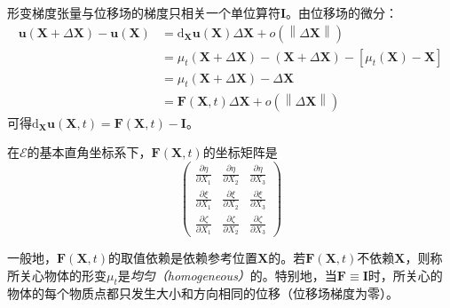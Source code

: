 \documentclass[main.tex]{subfiles}
\begin{document}
形变梯度张量与位移场的梯度只相关一个单位算符$\mathbf{I}$。由位移场的微分：
\begin{align*}
    \mathbf{u}\left(\mathbf{X}+\Delta\mathbf{X}\right)-\mathbf{u}\left(\mathbf{X}\right) & =\mathrm{d}_{\mathbf{X}}\mathbf{u}\left(\mathbf{X}\right)\Delta\mathbf{X}+o\left(\left\|\Delta\mathbf{X}\right\|\right)                      \\
                                                                                         & =\mu_t\left(\mathbf{X}+\Delta\mathbf{X}\right)-\left(\mathbf{X}+\Delta\mathbf{X}\right)-\left[\mu_t\left(\mathbf{X}\right)-\mathbf{X}\right] \\
                                                                                         & =\mu_t\left(\mathbf{X}+\Delta\mathbf{X}\right)-\Delta\mathbf{X}                                                                              \\
                                                                                         & =\mathbf{F}\left(\mathbf{X},t\right)\Delta\mathbf{X}+o\left(\left\|\Delta\mathbf{X}\right\|\right)
\end{align*}
可得$\mathrm{d}_{\mathbf{X}}\mathbf{u}\left(\mathbf{X},t\right)=\mathbf{F}\left(\mathbf{X},t\right)-\mathbf{I}$。

在$\mathcal{E}$的基本直角坐标系下，$\mathbf{F}\left(\mathbf{X},t\right)$的坐标矩阵是
\[\left(\begin{array}{ccc}\frac{\partial \eta}{\partial X_1} & \frac{\partial\eta}{\partial X_2}  & \frac{\partial\eta}{\partial X_3}  \\
             \frac{\partial\xi}{\partial X_1}        & \frac{\partial\xi}{\partial X_2}   & \frac{\partial\xi}{\partial X_3}   \\
             \frac{\partial\zeta}{\partial X_1}      & \frac{\partial\zeta}{\partial X_2} & \frac{\partial\zeta}{\partial X_3}\end{array}\right)\]

一般地，$\mathbf{F}\left(\mathbf{X},t\right)$的取值依赖是依赖参考位置$\mathbf{X}$的。若$\mathbf{F}\left(\mathbf{X},t\right)$不依赖$\mathbf{X}$，则称所关心物体的形变$\mu_t$是\emph{均匀（homogeneous）}的。特别地，当$\mathbf{F}\equiv\mathbf{I}$时，所关心的物体的每个物质点都只发生大小和方向相同的位移（位移场梯度为零）。
\end{document}
